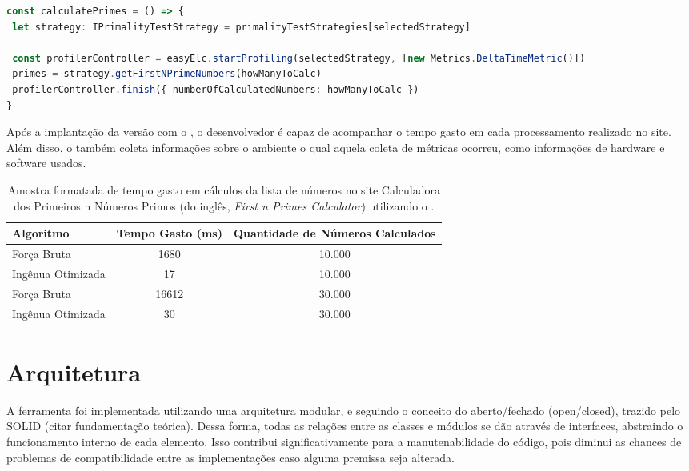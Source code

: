 \documentclass[12pt]{tcc}
\begin{document}
\begin{lstlisting}[label={lst:easyelc_usage_firstnprimes}, caption={Coleta de métricas usando o EasyElc no site Calculadora dos Primeiros n Números Primos.}, language=TypeScript, breaklines=true]
const calculatePrimes = () => {
 let strategy: IPrimalityTestStrategy = primalityTestStrategies[selectedStrategy]

 const profilerController = easyElc.startProfiling(selectedStrategy, [new Metrics.DeltaTimeMetric()])
 primes = strategy.getFirstNPrimeNumbers(howManyToCalc)
 profilerController.finish({ numberOfCalculatedNumbers: howManyToCalc })
}
\end{lstlisting}

Após a implantação da versão com o , o desenvolvedor é capaz de acompanhar o tempo gasto em cada processamento realizado no site.
Além disso, o  também coleta informações sobre o ambiente o qual aquela coleta de métricas ocorreu, como informações de hardware e software usados.

\begin{table}[!h]
    \centering
    \caption{Amostra formatada de tempo gasto em cálculos da lista de números no site Calculadora dos Primeiros n Números Primos (do inglês, \emph{First n Primes Calculator}) utilizando o .}
    \begin{tabular}{lcc}
        \hline
        Algoritmo & Tempo Gasto (ms) & Quantidade de Números Calculados \\
        \hline
		Força Bruta & 1680 & 10.000 \\
		Ingênua Otimizada & 17 & 10.000 \\
		Força Bruta & 16612 & 30.000 \\
        Ingênua Otimizada & 30 & 30.000 \\
        \hline
    \end{tabular}
\end{table}

\section{Arquitetura}
\label{cap:arquitetura}

A ferramenta foi implementada utilizando uma arquitetura modular, e seguindo o conceito do aberto/fechado (open/closed), trazido pelo SOLID (citar fundamentação teórica). Dessa forma, todas as relações entre as classes e módulos se dão através de interfaces, abstraindo o funcionamento interno de cada elemento. Isso contribui significativamente para a manutenabilidade do código, pois diminui as chances de problemas de compatibilidade entre as implementações caso alguma premissa seja alterada.
\end{document}
